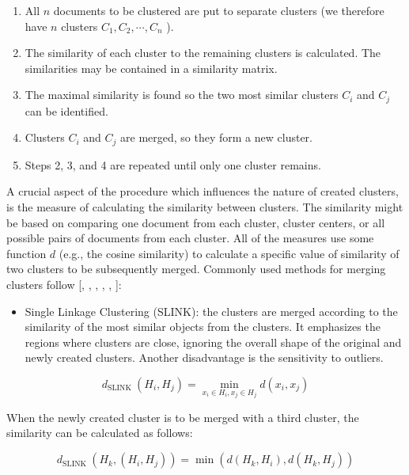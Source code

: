 \begin{enumerate}
  \item All $n$ documents to be clustered are put to separate clusters (we therefore have $n$ clusters $C_{1}, C_{2}, \cdots, C_{n}$ ).
  \item The similarity of each cluster to the remaining clusters is calculated. The similarities may be contained in a similarity matrix.
  \item The maximal similarity is found so the two most similar clusters $C_{i}$ and $C_{j}$ can be identified.
  \item Clusters $C_{i}$ and $C_{j}$ are merged, so they form a new cluster.
  \item Steps 2, 3, and 4 are repeated until only one cluster remains.
\end{enumerate}

A crucial aspect of the procedure which influences the nature of created clusters, is the measure of calculating the similarity between clusters. The similarity might be based on comparing one document from each cluster, cluster centers, or all possible pairs of documents from each cluster. All of the measures use some function $d$ (e.g., the cosine similarity) to calculate a specific value of similarity of two clusters to be subsequently merged. Commonly used methods for merging clusters follow [\cite{ref5}, \cite{ref185}, \cite{ref230}, \cite{ref128}, \cite{ref45}, \cite{ref81}]:

\begin{itemize}
  \item Single Linkage Clustering (SLINK): the clusters are merged according to the similarity of the most similar objects from the clusters. It emphasizes the regions where clusters are close, ignoring the overall shape of the original and newly created clusters. Another disadvantage is the sensitivity to outliers.
\end{itemize}


\begin{equation*}
d_{\text {SLINK }}\left(H_{i}, H_{j}\right)=\min _{x_{i} \in H_{i}, x_{j} \in H_{j}} d\left(x_{i}, x_{j}\right) \tag{12.25}
\end{equation*}


When the newly created cluster is to be merged with a third cluster, the similarity can be calculated as follows:


\begin{equation*}
d_{\text {SLINK }}\left(H_{k},\left(H_{i}, H_{j}\right)\right)=\min \left(d\left(H_{k}, H_{i}\right), d\left(H_{k}, H_{j}\right)\right) \tag{12.26}
\end{equation*}


